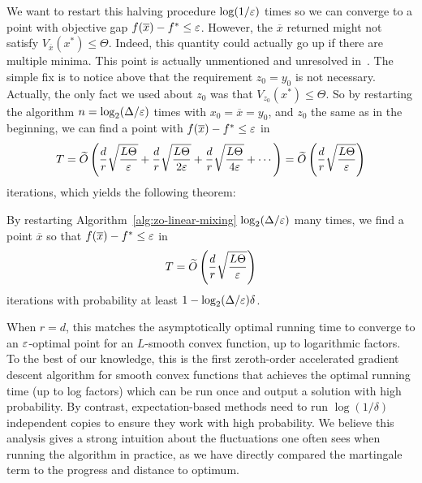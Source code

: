  We want to restart this halving procedure $\log(1/\varepsilon)$ times so we can converge to a point with objective gap $f(\overline x) - f^* \leq \varepsilon$. However, the $\overline x$ returned might not satisfy $V_{\overline x}(x^*) \leq \Theta$. Indeed, this quantity could actually go up if there are multiple minima. This point is actually unmentioned and unresolved in~\citet{allenZhu2016linear}. The simple fix is to notice above that the requirement $z_0=y_0$ is not necessary. Actually, the only fact we used about $z_0$ was that $V_{z_0}(x^*) \leq \Theta$. So by restarting the algorithm $n=\log_2(\Delta/\varepsilon)$ times with $x_0 = \overline x = y_0$, and $z_0$ the same as in the beginning, we can find a point with $f(\overline x) - f^* \leq \varepsilon$ in
 \begin{align*}
    T = \widetilde{O}\left(\frac{d}{r} \sqrt{\frac{L\Theta}{\varepsilon}} +\frac{d}{r} \sqrt{\frac{L\Theta}{2\varepsilon}} + \frac{d}{r} \sqrt{\frac{L\Theta}{4\varepsilon}} + \cdots \right) = \widetilde{O}\left(\frac{d}{r} \sqrt{\frac{L\Theta}{\varepsilon}}\right) 
 \end{align*}
iterations, which yields the following theorem:
\begin{theorem}
    By restarting Algorithm~\ref{alg:zo-linear-mixing} $\log_2(\Delta/\varepsilon)$ many times, we find a point $\overline x$ so that $f(\overline x) - f^* \leq \varepsilon$ in 
    \begin{align*}
        T = \widetilde{O}\left(\frac{d}{r} \sqrt{\frac{L\Theta}{\varepsilon}}\right) 
    \end{align*}
    iterations with probability at least $1-\log_2(\Delta/\varepsilon) \delta$.
\end{theorem}
When $r=d$, this matches the asymptotically optimal running time to converge to an $\varepsilon$-optimal point for an $L$-smooth convex function, up to logarithmic factors. To the best of our knowledge, this is the first zeroth-order accelerated gradient descent algorithm  for smooth convex functions that achieves the optimal running time (up to log factors) which can be run once and output a solution with high probability. By contrast, expectation-based methods need to run $\log(1/\delta)$ independent copies to ensure they work with high probability. We believe this analysis gives a strong intuition about the fluctuations one often sees when running the algorithm in practice, as we have directly compared the martingale term to the progress and distance to optimum.
